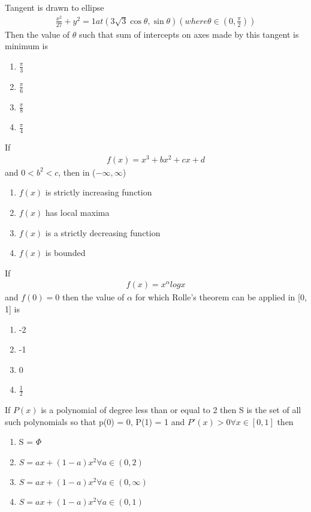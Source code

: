 \item Tangent is drawn to ellipse
\begin{align*}
\frac{x^2}{27} + y^2 = 1 at (3\sqrt{3}\cos \theta, \sin \theta)(where \theta \in (0, \frac{\pi}{2}))
\end{align*}
Then the value of $\theta$ such that sum of intercepts on axes made by this tangent is minimum is
\begin{enumerate}
\item $\frac{\pi}{3}$
\item $\frac{\pi}{6}$
\item $\frac{\pi}{8}$
\item $\frac{\pi}{4}$
\end{enumerate}

\item If 
\begin{align*}
f(x) = x^3 + bx^2 + cx + d 
\end{align*} 
and $0 < b^2 < c$, then in ($-\infty, \infty$)
\begin{enumerate}
\item $f(x)$ is strictly increasing function
\item $f(x)$ has local maxima
\item $f(x)$ is a strictly decreasing function 
\item $f(x)$ is bounded
\end{enumerate}

\item If 
\begin{align*}
f(x) = x^{\alpha} log x
\end{align*}
and $f(0) = 0$ then the value of $\alpha$ for which Rolle's theorem can be applied in [0, 1] is
\begin{enumerate}
\item -2
\item -1
\item 0
\item $\frac{1}{2}$
\end{enumerate}

\item If $P(x)$ is a polynomial of degree less than or equal to 2 then S is the set of all such polynomials so that p(0) = 0, P(1) = 1 and  $P'(x) > 0 \forall x \in [0,1]$ then 
\begin{enumerate}
\item S = $\Phi$
\item $S = ax + (1 - a)x^2 \forall a\in(0, 2)$
\item $S = ax + (1 - a)x^2 \forall a\in(0, \infty)$
\item $S = ax + (1 - a)x^2 \forall a\in(0, 1)$
\end{enumerate}
 
